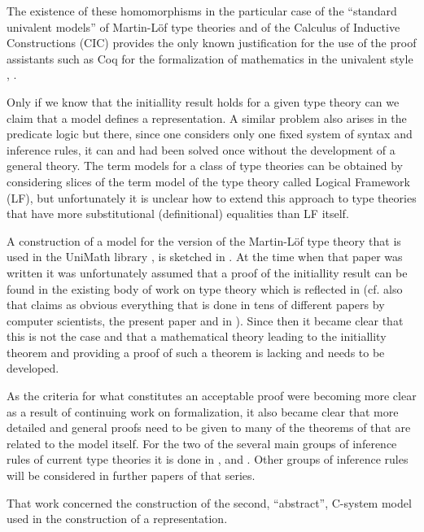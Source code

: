 \documentclass[12pt]{amsart}
\begin{document}
The existence of these homomorphisms in the particular case of the ``standard univalent models'' of  Martin-L\"{o}f type theories and of the Calculus of Inductive Constructions (CIC) provides the only known justification for the use of the proof assistants such as Coq for the formalization of mathematics in the univalent style \cite{UniMath2015}, \cite{UniMath}. 

Only if we know that the initiallity result holds for a given type theory can we claim that a model defines a representation. A similar problem also arises in the predicate logic but there, since one considers only one fixed system of syntax and inference rules, it can and had been solved once without the development of a general theory. The term models for a class of type theories can be obtained by considering slices of the term model of the type theory called Logical Framework (LF), but unfortunately it is unclear how to extend this approach to type theories that have more substitutional (definitional) equalities than LF itself.

A construction of a model for the version of the Martin-L\"{o}f type theory that is used in the UniMath library \cite{UniMath}, \cite{UniMath2015} is sketched in \cite{KLV1}. At the time when that paper was written it was unfortunately assumed that a proof of the initiallity result can be found in the existing body of work on type theory which is reflected  in \cite[Theorem 1.2.9]{KLV1} (cf. also \cite[Example 1.2.3]{KLV1} that claims as obvious everything that is done in tens of different papers by computer scientists, the present paper and in \cite{Csubsystems}).  Since then it became clear that this is not the case and that a mathematical theory leading to the initiallity theorem and providing a proof of such a theorem is lacking and needs to be developed. 

As the criteria for what constitutes an acceptable proof were becoming more clear as a result of continuing work on formalization, it also became clear that more detailed and general proofs need to be given to many of the theorems of \cite{KLV1} that are related to the model itself. For the two of the several main groups of inference rules of current type theories it is done in \cite{fromunivwithPiI}, \cite{fromunivwithPiII}  and \cite{fromunivwithpaths}. Other groups of inference rules will be considered in further papers of that series. 

That work concerned the construction of the second, ``abstract'', C-system model used in the construction of a representation.
\end{document}
